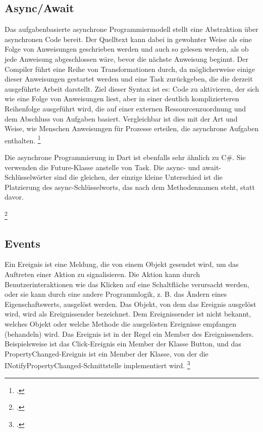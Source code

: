 \subsection{Async/Await}
Das aufgabenbasierte asynchrone Programmiermodell stellt eine Abstraktion über asynchronen Code bereit. Der Quelltext kann dabei in gewohnter Weise als eine Folge von Anweisungen geschrieben werden und auch so gelesen werden, als ob jede Anweisung abgeschlossen wäre, bevor die nächste Anweisung beginnt. Der Compiler führt eine Reihe von Transformationen durch, da möglicherweise einige dieser Anweisungen gestartet werden und eine Task zurückgeben, die die derzeit ausgeführte Arbeit darstellt.
Ziel dieser Syntax ist es: Code zu aktivieren, der sich wie eine Folge von Anweisungen liest, aber in einer deutlich komplizierteren Reihenfolge ausgeführt wird, die auf einer externen Ressourcenzuordnung und dem Abschluss von Aufgaben basiert. Vergleichbar ist dies mit der Art und Weise, wie Menschen Anweisungen für Prozesse erteilen, die asynchrone Aufgaben enthalten.  \footcite[Vgl. MICROSFT Async await][Abgerufen am \today]{GoogleFlutterSharedPreferences2020} 

Die asynchrone Programmierung in Dart ist ebenfalls sehr ähnlich zu C\#. Sie verwenden die Future-Klasse anstelle von Task. Die async- und await-Schlüsselwörter sind die gleichen, der einzige kleine Unterschied ist die Platzierung des async-Schlüsselworts, das nach dem Methodennamen steht, statt davor.

\begin{minipage}{\linewidth}

\end{minipage}
\footcitetext[In Anlehnung an ][Abgerufen am \today]{Pedley2019}


\subsection{Events}
Ein Ereignis ist eine Meldung, die von einem Objekt gesendet wird, um das Auftreten einer Aktion zu signalisieren. Die Aktion kann durch Benutzerinteraktionen wie das Klicken auf eine Schaltfläche verursacht werden, oder sie kann durch eine andere Programmlogik, z. B. das Ändern eines Eigenschaftswerts, ausgelöst werden. Das Objekt, von dem das Ereignis ausgelöst wird, wird als Ereignissender bezeichnet. Dem Ereignissender ist nicht bekannt, welches Objekt oder welche Methode die ausgelösten Ereignisse empfangen (behandeln) wird. Das Ereignis ist in der Regel ein Member des Ereignissenders. Beispielsweise ist das Click-Ereignis ein Member der Klasse Button, und das PropertyChanged-Ereignis ist ein Member der Klasse, von der die INotifyPropertyChanged-Schnittstelle implementiert wird. \footcite[Vgl. MICROSFT Events][Abgerufen am \today]{GoogleFlutterSharedPreferences2020} 

